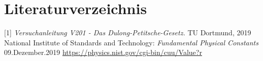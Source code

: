 \documentclass[titlepage = firstcover]{scrartcl}
\begin{document}
    \newpage
    
    \section{Literaturverzeichnis}
        [1] \textit{Versuchanleitung V201 - Das Dulong-Petitsche-Gesetz.} TU Dortmund, 2019 \newline
        [2] National Institute of Standards and Technology: \textit{Fundamental Physical Constants} 09.Dezember.2019
            \url{https://physics.nist.gov/cgi-bin/cuu/Value?r}
        
\end{document}
